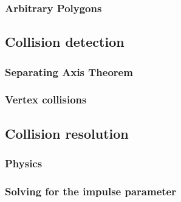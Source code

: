 \subsubsection{Arbitrary Polygons}
\subsection{Collision detection}
\subsubsection{Separating Axis Theorem}
\subsubsection{Vertex collisions}

\subsection{Collision resolution}
\label{sub:resolution}
\cite{collision:resolution}
\subsubsection{Physics}
\subsubsection{Solving for the impulse parameter}
